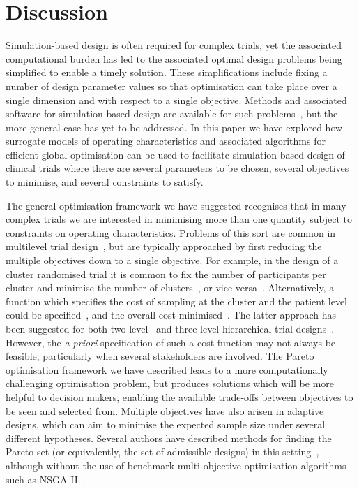 \documentclass{article} %
\begin{document}
\section{Discussion}\label{sec:discussion}

Simulation-based design is often required for complex trials, yet the associated computational burden has led to the associated optimal design problems being simplified to enable a timely solution. These simplifications include fixing a number of design parameter values so that optimisation can take place over a single dimension and with respect to a single objective. Methods and associated software for simulation-based design are available for such problems~\cite{Landau2013, Hooper2013}, but the more general case has yet to be addressed. In this paper we have explored how surrogate models of operating characteristics and associated algorithms for efficient global optimisation can be used to facilitate simulation-based design of clinical trials where there are several parameters to be chosen, several objectives to minimise, and several constraints to satisfy.

The general optimisation framework we have suggested recognises that in many complex trials we are interested in minimising more than one quantity subject to constraints on operating characteristics. Problems of this sort are common in multilevel trial design~\cite{Hemming2017}, but are typically approached by first reducing the multiple objectives down to a single objective. For example, in the design of a cluster randomised trial it is common to fix the number of participants per cluster and minimise the number of clusters~\cite{Donner2000}, or vice-versa~\cite{Hemming2011, Eldridge2015}. Alternatively, a function which specifies the cost of sampling at the cluster and the patient level could be specified~\cite[p. 175]{Hox2002}, and the overall cost minimised~\cite{Snijders1993}. The latter approach has been suggested for both two-level~\cite{Raudenbush2000} and three-level hierarchical trial designs~\cite{Breukelen2012, Teerenstra2008}. However, the \emph{a priori} specification of such a cost function may not always be feasible, particularly when several stakeholders are involved. The Pareto optimisation framework we have described leads to a more computationally challenging optimisation problem, but produces solutions which will be more helpful to decision makers, enabling the available trade-offs between objectives to be seen and selected from. Multiple objectives have also arisen in adaptive designs, which can aim to minimise the expected sample size under several different hypotheses. Several authors have described methods for finding the Pareto set (or equivalently, the set of admissible designs) in this setting~\cite{Jung2001, Jung2004, Mander2012}, although without the use of benchmark multi-objective optimisation algorithms such as NSGA-II~\cite{Deb2002}.
\end{document}
